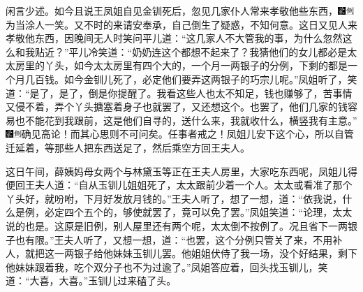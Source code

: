 闲言少述。如今且说王凤姐自见金钏死后，忽见几家仆人常来孝敬他些东西，{\includegraphics[width=3mm]{../Images/00006}\includegraphics[width=3mm]{../Images/00011}\footnotesize \kaishu 为当涂人一笑。}又不时的来请安奉承，自己倒生了疑惑，不知何意。这日又见人来孝敬他东西，因晚间无人时笑问平儿道：“这几家人不大管我的事，为什么忽然这么和我贴近？”平儿冷笑道：“奶奶连这个都想不起来了？我猜他们的女儿都必是太太房里的丫头，如今太太房里有四个大的，一个月一两银子的分例，下剩的都是一个月几百钱。如今金钏儿死了，必定他们要弄这两银子的巧宗儿呢。”凤姐听了，笑道：“是了，是了，倒是你提醒了。我看这些人也太不知足，钱也赚够了，苦事情又侵不着，弄个丫头搪塞着身子也就罢了，又还想这个。也罢了，他们几家的钱容易也不能花到我跟前，这是他们自寻的，送什么来，我就收什么，横竖我有主意。”{\includegraphics[width=3mm]{../Images/00006}\includegraphics[width=3mm]{../Images/00011}\footnotesize \kaishu 确见高论！而其心思则不可问矣。任事者戒之！}凤姐儿安下这个心，所以自管迁延着，等那些人把东西送足了，然后乘空方回王夫人。

这日午间，薛姨妈母女两个与林黛玉等正在王夫人房里，大家吃东西呢，凤姐儿得便回王夫人道：“自从玉钏儿姐姐死了，太太跟前少着一个人。太太或看准了那个丫头好，就吩咐，下月好发放月钱的。”王夫人听了，想了一想，道：“依我说，什么是例，必定四个五个的，够使就罢了，竟可以免了罢。”凤姐笑道：“论理，太太说的也是。这原是旧例，别人屋里还有两个呢，太太倒不按例了。况且省下一两银子也有限。”王夫人听了，又想一想，道：“也罢，这个分例只管关了来，不用补人，就把这一两银子给他妹妹玉钏儿罢。他姐姐伏侍了我一场，没个好结果，剩下他妹妹跟着我，吃个双分子也不为过逾了。”凤姐答应着，回头找玉钏儿，笑道：“大喜，大喜。”玉钏儿过来磕了头。


